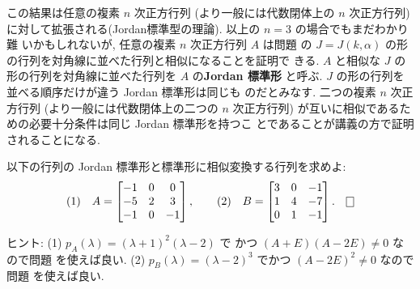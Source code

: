 \documentclass[12pt,twoside]{jarticle}
\begin{document}
この結果は任意の複素 $n$ 次正方行列 (より一般には代数閉体上の $n$ 次正方行列)
に対して拡張される(Jordan標準型の理論).  以上の $n=3$ の場合でもまだわかり難
いかもしれないが, 任意の複素 $n$ 次正方行列 $A$ は問題  
の $J = J(k,\alpha)$ の形の行列を対角線に並べた行列と相似になることを証明で
きる.  $A$ と相似な $J$ の形の行列を対角線に並べた行列を $A$ の{\bf Jordan 
標準形} と呼ぶ.  $J$ の形の行列を並べる順序だけが違う Jordan 標準形は同じも
のだとみなす.  二つの複素 $n$ 次正方行列 (より一般には代数閉体上の二つの $n$ 
次正方行列) が互いに相似であるための必要十分条件は同じ Jordan 標準形を持つこ
とであることが講義の方で証明されることになる.


\begin{question}[小問各8点]
\label{q:jordan-3x3-1}
  以下の行列の Jordan 標準形と標準形に相似変換する行列を求めよ:
  \begin{equation*}
    \text{(1)}\quad
    A =
    \begin{bmatrix}
      -1 &  0 &  0 \\
      -5 &  2 &  3 \\
      -1 &  0 & -1 \\
    \end{bmatrix},
    \qquad
    \text{(2)}\quad
    B =
    \begin{bmatrix}
      3 & 0 & -1 \\
      1 & 4 & -7 \\
      0 & 1 & -1 \\
    \end{bmatrix}.
    \qed
  \end{equation*}
\end{question}

\noindent
ヒント: (1) $p_A(\lambda)=(\lambda+1)^2(\lambda-2)$ で
かつ $(A+E)(A-2E)\ne 0$ なので問題  を使えば良い. 
(2) $p_B(\lambda)=(\lambda-2)^3$ でかつ $(A-2E)^2\ne0$ なので
問題  を使えば良い.
\end{document}
